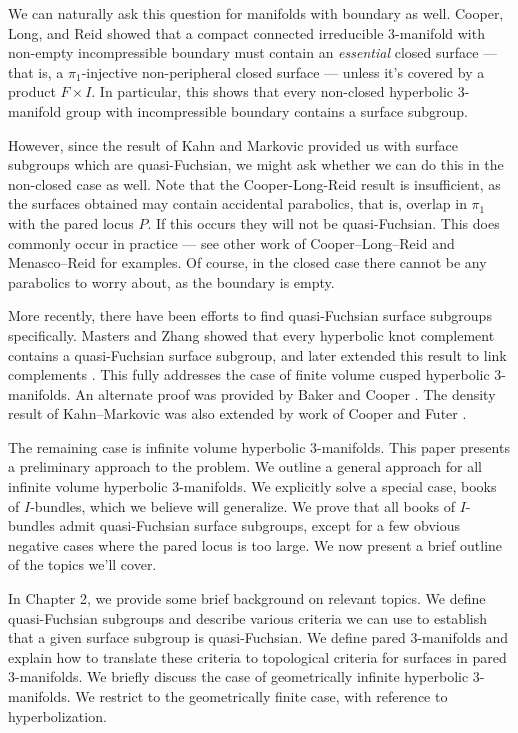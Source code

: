We can naturally ask this question for manifolds with boundary as well.
Cooper, Long, and Reid showed \cite{CLR} that a compact connected irreducible
$3$-manifold with non-empty incompressible boundary  must contain an
\emph{essential} closed surface --- that is, a $\pi_1$-injective non-peripheral
closed surface ---  unless it's covered by a product $F\times I$.  In
particular, this shows that every non-closed hyperbolic $3$-manifold group with
incompressible boundary contains a surface subgroup.

However, since the result of Kahn and Markovic provided us with surface
subgroups which are quasi-Fuchsian, we might ask whether we can do this in the
non-closed case as well. Note that the Cooper-Long-Reid result is insufficient,
as the surfaces obtained may contain accidental parabolics, that is, overlap in
$\pi_1$ with the pared locus $P$. If this occurs they will not be
quasi-Fuchsian. This does commonly occur in practice --- see other work of
Cooper--Long--Reid \cite{CLRbundles} and Menasco--Reid \cite{MenascoReid} for
examples.  Of course, in the closed case there cannot be any parabolics to
worry about, as the boundary is empty.

More recently, there have been efforts to find quasi-Fuchsian surface subgroups
specifically. Masters and Zhang \cite{MZ} showed that every hyperbolic knot
complement contains a quasi-Fuchsian surface subgroup, and later extended this
result to link complements \cite{MZ2}. This fully addresses the case of finite
volume cusped hyperbolic $3$-manifolds. An alternate proof was provided by
Baker and Cooper \cite{BC}. The density result of Kahn--Markovic was also
extended by work of Cooper and Futer \cite{CooperFuter}.

The remaining case is infinite volume hyperbolic $3$-manifolds. This paper
presents a preliminary approach to the problem. We outline a general approach
for all infinite volume hyperbolic $3$-manifolds. We explicitly solve a special
case, books of $I$-bundles, which we believe will generalize. We prove that all
books of $I$-bundles admit quasi-Fuchsian surface subgroups, except for a few
obvious negative cases where the pared locus is too large. We now present
a brief outline of the topics we'll cover.

In Chapter 2, we provide some brief background on relevant topics. We define
quasi-Fuchsian subgroups and describe various criteria we can use to establish
that a given surface subgroup is quasi-Fuchsian. We define pared $3$-manifolds
and explain how to translate these criteria to topological criteria for
surfaces in pared $3$-manifolds. We briefly discuss the case of geometrically
infinite hyperbolic $3$-manifolds. We restrict to the geometrically finite
case, with reference to hyperbolization.

